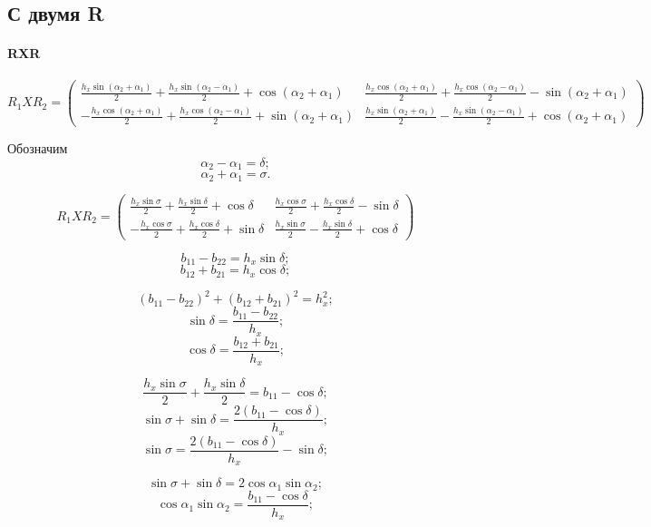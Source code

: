 \subsection{С двумя R}

\paragraph{RXR}

$$R_1XR_2 = 
\begin{pmatrix}
 \frac{{h_x}\sin{\left( {\alpha_2}+{\alpha_1}\right) } }{2}+\frac{{h_x}\sin{\left( {\alpha_2}-{\alpha_1}\right) } }{2}+\cos{\left( {\alpha_2}+{\alpha_1}\right) } & 
 \frac{{h_x}\cos{\left( {\alpha_2}+{\alpha_1}\right) } }{2}+\frac{{h_x}\cos{\left( {\alpha_2}-{\alpha_1}\right) } }{2}-\sin{\left( {\alpha_2}+{\alpha_1}\right) } \\
-\frac{{h_x}\cos{\left( {\alpha_2}+{\alpha_1}\right) } }{2}+\frac{{h_x}\cos{\left( {\alpha_2}-{\alpha_1}\right) } }{2}+\sin{\left( {\alpha_2}+{\alpha_1}\right) } & 
 \frac{{h_x}\sin{\left( {\alpha_2}+{\alpha_1}\right) } }{2}-\frac{{h_x}\sin{\left( {\alpha_2}-{\alpha_1}\right) } }{2}+\cos{\left( {\alpha_2}+{\alpha_1}\right) }
\end{pmatrix}
$$

Обозначим 
$$\alpha_2 - \alpha_1 = \delta;$$
$$\alpha_2 + \alpha_1 = \sigma.$$

$$R_1XR_2 = 
\begin{pmatrix}
 \frac{{h_x}\sin\sigma }{2}+\frac{{h_x}\sin\delta }{2}+\cos\delta & 
 \frac{{h_x}\cos\sigma }{2}+\frac{{h_x}\cos\delta }{2}-\sin\delta \\
-\frac{{h_x}\cos\sigma }{2}+\frac{{h_x}\cos\delta }{2}+\sin\delta & 
 \frac{{h_x}\sin\sigma }{2}-\frac{{h_x}\sin\delta }{2}+\cos\delta
\end{pmatrix}
$$

$$b_{11} - b_{22} = h_x \sin\delta;$$
$$b_{12} + b_{21} = h_x \cos\delta ;$$

$$\left(b_{11} - b_{22}\right)^2 + \left(b_{12} + b_{21}\right)^2 = h_x^2;$$
$$\sin\delta = \frac{b_{11} - b_{22}}{h_x};$$
$$\cos\delta = \frac{b_{12} + b_{21}}{h_x};$$

$$\frac{{h_x}\sin\sigma }{2} + \frac{{h_x}\sin\delta }{2} = b_{11} - \cos\delta;$$
$$\sin\sigma + \sin\delta = \frac{2 (b_{11} - \cos\delta)}{h_x};$$
$$\sin\sigma = \frac{2 (b_{11} - \cos\delta)}{h_x} - \sin\delta;$$

$$\sin\sigma + \sin\delta = 2 \cos\alpha_1 \sin\alpha_2;$$
$$\cos\alpha_1 \sin\alpha_2 = \frac{b_{11} - \cos\delta}{h_x};$$


